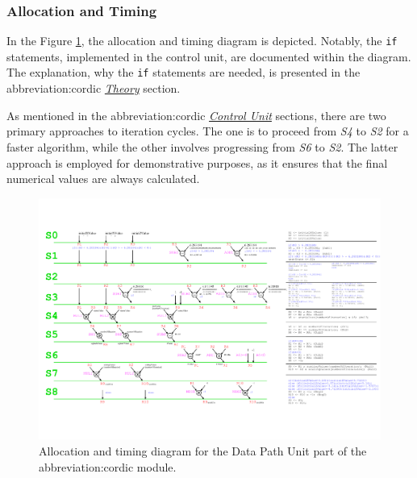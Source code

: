 \documentclass[a4paper, twoside, 11pt]{article}
\newcommand{\fbar}{\FloatBarrier}
\begin{document}
        \subsubsection{Allocation and Timing}
            In the Figure \ref{fig:cordic-allocation-timing}, the allocation and timing diagram is depicted. Notably, the \texttt{if} statements, implemented in the control unit, are documented within the diagram. The explanation, why the \texttt{if} statements are needed, is presented in the \gls{abbreviation:cordic} \hyperref[subsec:cordic-theory]{\textit{Theory}} section.\par
            As mentioned in the \gls{abbreviation:cordic} \hyperref[subsubsec:cordic-control-unit]{\textit{Control Unit}} sections, there are two primary approaches to iteration cycles. The one is to proceed from \textit{S4} to \textit{S2} for a faster algorithm, while the other involves progressing from \textit{S6} to \textit{S2}. The latter approach is employed for demonstrative purposes, as it ensures that the final numerical values are always calculated.
            \begin{figure}[htbp!]
                \centering
                \includegraphics[width=1\textwidth]{src/pdf/cordic-allocation-timing.pdf}
                \caption{Allocation and timing diagram for the Data Path Unit part of the \gls{abbreviation:cordic} module.}
                \label{fig:cordic-allocation-timing}
            \end{figure}
        \fbar
\end{document}
